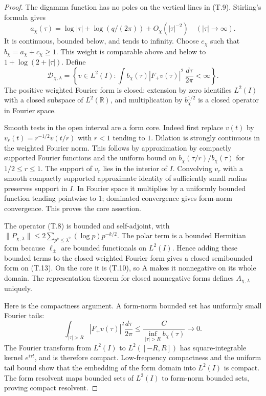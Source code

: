 \begin{proof}
The digamma function has no poles on the vertical lines
in (T.9). Stirling's formula gives
\[
 a_\chi(\tau)=\log|\tau|+\log(q/(2\pi))+O_\chi(|\tau|^{-2})
       \quad(|\tau|\longrightarrow\infty).
\]
It is continuous, bounded below, and tends to infinity.
Choose \(c_\chi\) such that \(b_\chi=a_\chi+c_\chi\geq1\).
This weight is comparable above and below to
\(1+\log(2+|\tau|)\). Define
\[
 \mathcal D_{\chi,\lambda}
 =\left\{v\in L^2(I):
  \int b_\chi(\tau)|F_+v(\tau)|^2\,\frac{d\tau}{2\pi}
                      <\infty\right\}.                       \tag{T.13}
\]
The positive weighted Fourier form is closed: extension
by zero identifies \(L^2(I)\) with a closed subspace of
\(L^2(\mathbb R)\), and multiplication by
\(b_\chi^{1/2}\) is a closed operator in Fourier space.

Smooth tests in the open interval are a form core.
Indeed first replace \(v(t)\) by
\(v_r(t)=r^{-1/2}v(t/r)\) with \(r<1\) tending to \(1\).
Dilation is strongly continuous in the weighted Fourier
norm. This follows by approximation by compactly supported
Fourier functions and the uniform bound on
\(b_\chi(\tau/r)/b_\chi(\tau)\) for \(1/2\leq r\leq1\).
The support of \(v_r\) lies in the interior of \(I\).
Convolving \(v_r\) with a smooth compactly supported
approximate identity of sufficiently small radius
preserves support in \(I\). In Fourier space it multiplies
by a uniformly bounded function tending pointwise to
\(1\); dominated convergence gives form-norm convergence.
This proves the core assertion.

The operator (T.8) is bounded and self-adjoint, with
\(\|P_{\chi,\lambda}\|\leq
2\sum_{p^k\leq\lambda^2}(\log p)p^{-k/2}\).
The polar term is a bounded Hermitian form because
\(\ell_\pm\) are bounded functionals on \(L^2(I)\).
Hence adding these bounded terms to the closed weighted
Fourier form gives a closed semibounded form on (T.13).
On the core it is (T.10), so A makes it nonnegative
on its whole domain. The representation theorem for
closed nonnegative forms defines
\(A_{\chi,\lambda}\) uniquely.

Here is the compactness argument. A form-norm bounded
set has uniformly small Fourier tails:
\[
 \int_{|\tau|>R}|F_+v(\tau)|^2\frac{d\tau}{2\pi}
 \leq
 \frac{C}{\inf_{|\tau|>R}b_\chi(\tau)}
 \longrightarrow0.
\]
The Fourier transform from \(L^2(I)\) to \(L^2([-R,R])\)
has square-integrable kernel \(e^{i\tau t}\), and is
therefore compact. Low-frequency compactness and the
uniform tail bound show that the embedding of the form
domain into \(L^2(I)\) is compact. The form resolvent
maps bounded sets of \(L^2(I)\) to form-norm bounded
sets, proving compact resolvent.


\end{proof}
